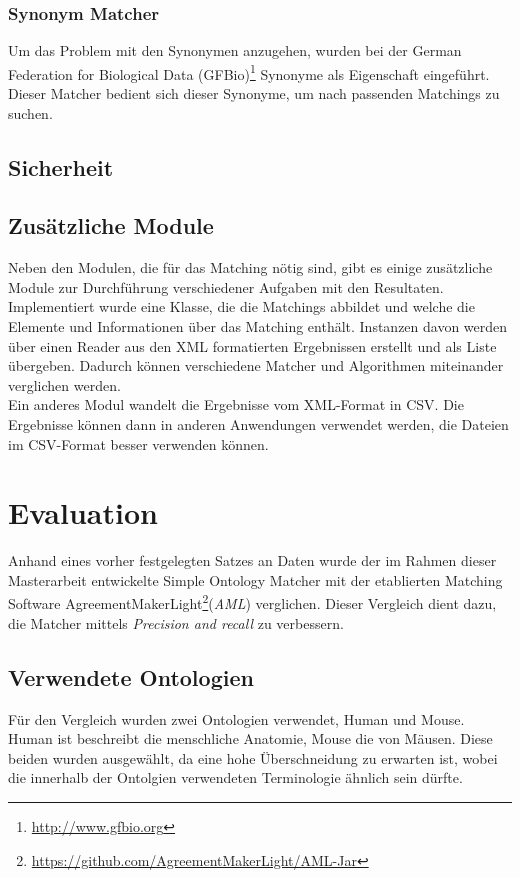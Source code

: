 		\subsubsection{Synonym Matcher}
		Um das Problem mit den Synonymen anzugehen, wurden bei der German Federation
		for Biological Data (GFBio)\footnote{\url{http://www.gfbio.org}} Synonyme als
		Eigenschaft eingeführt. Dieser Matcher bedient sich dieser Synonyme, um nach passenden
		Matchings zu suchen.
		
		\subsection{Sicherheit}
		
		\subsection{Zusätzliche Module}
		Neben den Modulen, die für das Matching nötig sind, gibt es einige zusätzliche
		Module zur Durchführung verschiedener Aufgaben mit den Resultaten.\\
		Implementiert wurde eine Klasse, die die Matchings abbildet und welche die
		Elemente und Informationen über das Matching enthält. Instanzen davon werden
		über einen Reader aus den XML formatierten Ergebnissen erstellt und als Liste
		übergeben. Dadurch können verschiedene Matcher und Algorithmen miteinander
		verglichen werden.\\
		Ein anderes Modul wandelt die Ergebnisse vom XML-Format in CSV. Die Ergebnisse
		können dann in anderen Anwendungen verwendet werden, die Dateien im CSV-Format
		besser verwenden können.
		
		\section{Evaluation}
		Anhand eines vorher festgelegten Satzes an Daten wurde der im Rahmen dieser
		Masterarbeit entwickelte Simple Ontology Matcher mit der etablierten Matching
		Software
		AgreementMakerLight\footnote{\url{https://github.com/AgreementMakerLight/AML-Jar}}(\textit{AML})
		verglichen. Dieser Vergleich dient dazu, die Matcher mittels \textit{Precision
		and recall} zu verbessern.
		
		\subsection{Verwendete Ontologien}
		Für den Vergleich wurden zwei Ontologien verwendet, Human und Mouse. Human
		ist beschreibt die menschliche Anatomie, Mouse die von Mäusen. Diese beiden
		wurden ausgewählt, da eine hohe Überschneidung zu erwarten ist, wobei die
		innerhalb der Ontolgien verwendeten Terminologie ähnlich sein dürfte.
		
